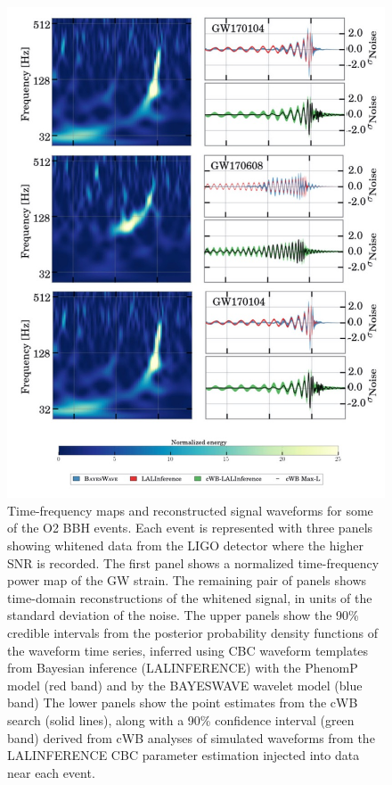 \documentclass[binding=0.6cm, LaM]{sapthesis}
\begin{document}
		\begin{figure}[H]
                        \label{o2}
                        \includegraphics[scale=0.45]{o2}
                        \centering
                        \caption{Time-frequency maps and reconstructed signal waveforms for some of the O2 BBH events.
				      Each event is represented with three panels showing whitened data 
				      from the LIGO detector where the higher SNR is recorded. 
				      The first panel shows a normalized time-frequency power map of the GW strain. 
				      The remaining pair of panels shows time-domain reconstructions of the whitened signal, 
				      in units of the standard deviation of the noise. 
			  	      The upper panels show the 90\% credible intervals from the posterior 
				      probability density functions of the waveform time series, 
				      inferred using CBC waveform templates from Bayesian inference (LALINFERENCE) 
				      with the PhenomP model (red band) and by the BAYESWAVE wavelet model (blue band) 
				      The lower panels show the point estimates from the cWB search (solid lines), 
				      along with a 90\% confidence interval (green band) derived from cWB analyses of 
				      simulated waveforms from the LALINFERENCE CBC parameter estimation injected into data near each event.}
                         \label{fig:o2}
                \end{figure}
\end{document}
